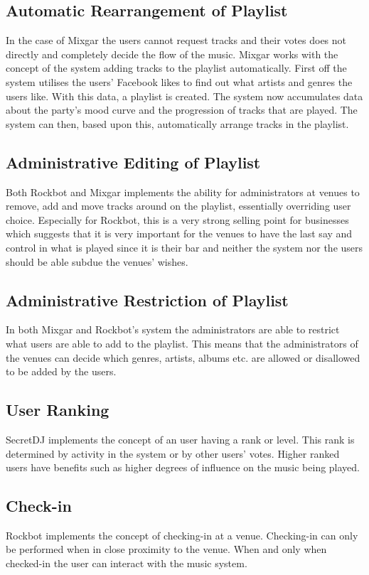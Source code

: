 \subsection{Automatic Rearrangement of Playlist}
\label{sub:auto_rearrange_playlist}
In the case of Mixgar the users cannot request tracks and their votes
does not directly and completely decide the flow of the music. Mixgar
works with the concept of the system adding tracks to the playlist
automatically. First off the system utilises the users’ Facebook likes
to find out what artists and genres the users like. With this data, a
playlist is created. The system now accumulates data about the party’s
mood curve and the progression of tracks that are played. The system
can then, based upon this, automatically arrange tracks in the
playlist.

\subsection{Administrative Editing of Playlist}
Both Rockbot and
Mixgar implements the ability for administrators at venues to remove, add
and move tracks around on the playlist, essentially overriding user choice. Especially for Rockbot, this
is a very strong selling point for businesses which suggests that it
is very important for the venues to have the last say and control in
what is played since it is their bar and neither the system nor the users
should be able subdue the venues' wishes.

\subsection{Administrative Restriction of Playlist}
In both Mixgar and Rockbot's system the administrators are able to
restrict what users are able to add to the playlist. This means that
the administrators of the venues can decide which genres, artists,
albums etc. are allowed or disallowed to be added by the users.

\subsection{User Ranking}
SecretDJ implements the concept of an user having a rank or
level. This rank is determined by activity in the system or by other
users' votes. Higher ranked users have benefits such as higher degrees
of influence on the music being played.

\subsection{Check-in}
Rockbot implements the concept of checking-in at a venue. Checking-in
can only be performed when in close proximity to the venue. When and
only when checked-in the user can interact with the music system.


